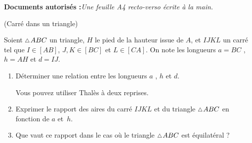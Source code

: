 \documentclass[a4paper,12pt,reqno]{amsart}
\begin{document}
\ifsolutions\else
\textbf{Documents autorisés :}\textit{Une feuille A4 recto-verso écrite à la main.}

\vspace{21mm}
\fi


\begin{exo} (Carré dans un  triangle)

  Soient $\tri ABC$ un triangle, $H$ le pied de la hauteur issue de $A$, et $IJKL$ un carré tel que $I \in [AB]$, $J,K \in [BC]$ et $L \in [CA]$. On note les longueurs $a=BC$ , $h=AH$ et $d=IJ$.
  \begin{enumerate}
    \item Déterminer une relation entre les longueurs $a$ , $h$ et $d$.\\
    \begin{indication}
      Vous pouvez utiliser Thalès à deux reprises.
    \end{indication}
    \item Exprimer le rapport des aires du carré $IJKL$ et du triangle $\tri ABC$ en fonction de $a$ et~$h$.
    \item Que vaut ce rapport dans le cas où le triangle $\tri ABC$ est équilatéral ?
  \end{enumerate}
\end{exo}
\end{document}
